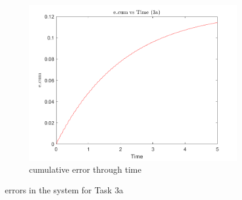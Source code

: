 \documentclass[a4paper,12pt]{article}
\begin{document}
\begin{figure}[h]
  \vspace{0.5cm}

  \begin{subfigure}[b]{0.5\textwidth}
      \includegraphics[width=\textwidth]{../../Matlab/task3a_plots/e_cum_vs_time.png}
      \caption{cumulative error through time}
      \label{fig:image6}
  \end{subfigure}
  \hfill
  
  \caption{errors in the system for Task 3a}
  \label{fig:error_task3a}
\end{figure}




\end{document}
